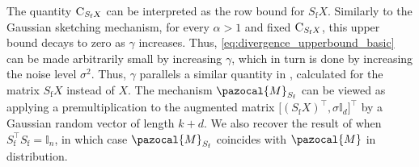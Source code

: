 \documentclass[11pt]{article}
\theoremstyle{definition}
\theoremstyle{plain}
\newtheorem{remark}{Remark}
\providecommand{\brI}{\mathbb{I}}
\newcommand{\pM}{\pazocal{M}}
\begin{document}
\bigskip 

The quantity \(\textsc{C}_{S_{\mathrm{f}}X}\) can be interpreted as the row bound for \(S_{\mathrm{f}}X\).
Similarly to the Gaussian sketching mechanism, for every $\alpha > 1$ and fixed $\textsc{C}_{S_{\mathrm{f}}X}$, this upper bound decays to zero as $\gamma$ increases. Thus, \eqref{eq:divergence_upperbound_basic} can be made arbitrarily small by increasing $\gamma$, which in turn is done by increasing the noise level $\sigma^2$. Thus, $\gamma$ parallels a similar quantity in \citet[Lemma.~1]{lev2025gaussianmix}, calculated for the matrix $S_{\mathrm{f}}X$ instead of $X$.
The mechanism \(\pM_{S_{\mathrm{f}}}\) can be viewed as applying a premultiplication to the augmented matrix $\big[(S_{\mathrm{f}}X)^{\top}, \sigma \brI_d\big]^{\top}$ by a Gaussian random vector of length \(k + d\).
We also recover the result of \citet[Lemma.~1]{lev2025gaussianmix} when \(S^{\top}_{\mathrm{f}}S_{\mathrm{f}} = \brI_{n}\), in which case \(\pM_{S_{\mathrm{f}}}\) coincides with \(\pM\) in distribution.
\end{document}
